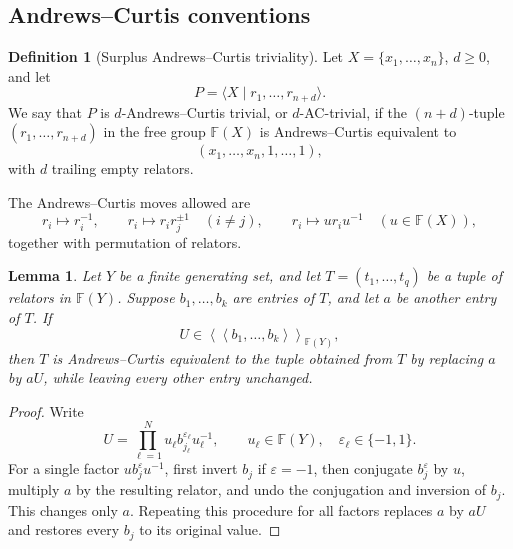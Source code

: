 \documentclass[a4paper,11pt,reqno]{amsart}
\newtheorem{lemma}[theorem]{Lemma}
\theoremstyle{definition}
\newtheorem{definition}[theorem]{Definition}
\theoremstyle{remark}
\newcommand{\Free}{\mathbb F}
\begin{document}
	\subsection*{Andrews--Curtis conventions}
	\label{sec:ac-setup}
	
	\begin{definition}[Surplus Andrews--Curtis triviality]
		Let $X=\{x_1,\dots,x_n\}$, $d\geq 0$, and let
		\[
		P=\langle X\mid r_1,\dots,r_{n+d}\rangle .
		\]
		We say that $P$ is $d$-Andrews--Curtis trivial, or $d$-AC-trivial, if the
		$(n+d)$-tuple $(r_1,\dots,r_{n+d})$ in the free group $\Free(X)$ is
		Andrews--Curtis equivalent to
		\[
		(x_1,\dots,x_n,1,\dots,1),
		\]
		with $d$ trailing empty relators.
		
		The Andrews--Curtis moves allowed are
		\[
		r_i\mapsto r_i^{-1},\qquad
		r_i\mapsto r_i r_j^{\pm1}\quad(i\neq j),\qquad
		r_i\mapsto u r_i u^{-1}\quad(u\in \Free(X)),
		\]
		together with permutation of relators.
	\end{definition}
	
	\begin{lemma}
		\label{lem:ambient-normal-closure}
		Let $Y$ be a finite generating set, and let $T=(t_1,\dots,t_q)$ be a tuple of
		relators in $\Free(Y)$. Suppose $b_1,\dots,b_k$ are entries of $T$, and let
		$a$ be another entry of $T$. If
		\[
		U\in\left\langle\!\left\langle b_1,\dots,b_k\right\rangle\!\right\rangle_{\Free(Y)},
		\]
		then $T$ is Andrews--Curtis equivalent to the tuple obtained from $T$ by
		replacing $a$ by $aU$, while leaving every other entry unchanged.
	\end{lemma}
	
	\begin{proof}
		Write
		\[
		U=\prod_{\ell=1}^{N}u_\ell b_{j_\ell}^{\varepsilon_\ell}u_\ell^{-1},
		\qquad u_\ell\in\Free(Y),\quad \varepsilon_\ell\in\{-1,1\}.
		\]
		For a single factor $u b_j^{\varepsilon}u^{-1}$, first invert $b_j$ if
		$\varepsilon=-1$, then conjugate $b_j^{\varepsilon}$ by $u$, multiply
		$a$ by the resulting relator, and undo the conjugation and inversion of
		$b_j$. This changes only $a$. Repeating this procedure for all factors
		replaces $a$ by $aU$ and restores every $b_j$ to its original value.
	\end{proof}
	
\end{document}
